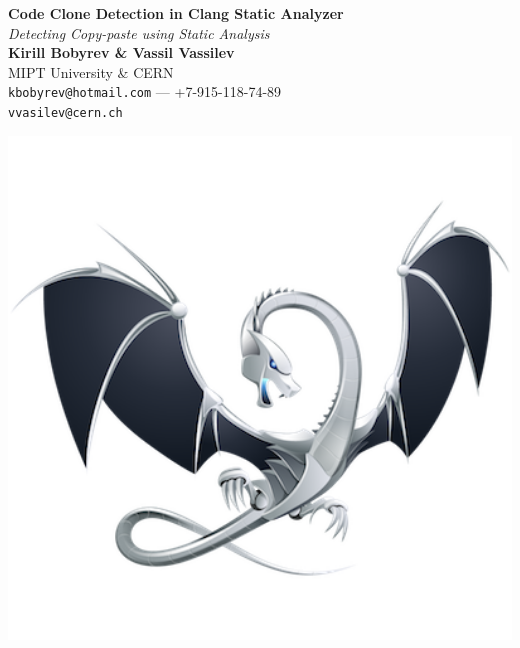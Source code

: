 \documentclass[a0,portrait]{a0poster}
\begin{document}


\begin{minipage}[b]{0.75\linewidth}
\veryHuge \textbf{Code Clone Detection in Clang Static Analyzer} \color{Black}\\ %
\Huge\textit{Detecting Copy-paste using Static Analysis}\\[2cm] %
\huge \textbf{Kirill Bobyrev \& Vassil Vassilev}\\[0.5cm] %
\huge MIPT University \& CERN\\[0.4cm] %
\Large \texttt{kbobyrev@hotmail.com} --- +7-915-118-74-89\\
\Large \texttt{vvasilev@cern.ch}\\
\end{minipage}
%
\begin{minipage}[b]{0.25\linewidth}
\includegraphics[width=20cm]{logo.png}\\
\end{minipage}
\end{document}
